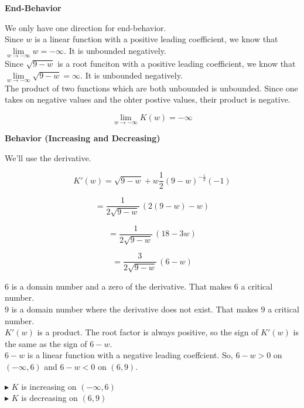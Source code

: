 \documentclass{ximera}
\begin{document}
\begin{example}
\textbf{End-Behavior}


We only have one direction for end-behavior. \\


Since $w$ is a linear function with a positive leading coefficient, we know that 
$\lim\limits_{w \to -\infty} w = -\infty$.  It is unbounded negatively. \\

Since $\sqrt{9-w}$ is a root funciton with a positive leading coefficient, we know that $\lim\limits_{w \to -\infty} \sqrt{9-w} = \infty$.   It is unbounded negatively. \\


The product of two functions which are both unbounded is unbounded.  Since one takes on negative values and the ohter postive values, their product is negative.


\[
\lim\limits_{w \to -\infty} K(w) = -\infty
\]




\textbf{Behavior (Increasing and Decreasing)}


We'll use the derivative.



\[
K'(w) = \sqrt{9 - w} + w \frac{1}{2} (9 - w)^{-\tfrac{1}{2}} (-1)
\]


\[
=   \frac{1}{2 \sqrt{9-w}} \, (2(9-w) - w) 
\]


\[
=   \frac{1}{2 \sqrt{9-w}} \, (18 - 3w) 
\]


\[
=   \frac{3}{2 \sqrt{9-w}} \, (6 - w) 
\]


$6$ is a domain number and a zero of the derivative.  That makes $6$ a critical number. \\


$9$ is a domain number where the derivative does not exist.  That makes $9$ a critical number. \\



$K'(w)$ is a product.  The root factor is always positive, so the sign of $K'(w)$ is the same as the sign of $6 - w$. \\


$6 - w$ is a linear function with a negative leading coeffcient. So, $6 - w > 0$ on $(-\infty, 6)$ and $6 - w < 0$ on $(6, 9)$.



$\blacktriangleright$ $K$ is increasing on $(-\infty, 6)$ \\

$\blacktriangleright$ $K$ is decreasing on $(6, 9)$ \\






\end{example}
\end{document}
